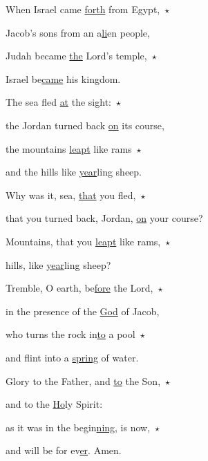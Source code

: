 \noindent When Israel came \uline{forth} from Egypt,~$\star$~\nopagebreak

Jacob’s sons from an a\uline{li}en people,

\noindent Judah became \uline{the} Lord’s temple,~$\star$~\nopagebreak

Israel be\uline{came} his kingdom.

\noindent The sea fled \uline{at} the sight:~$\star$~\nopagebreak

the Jordan turned back \uline{on} its course,

\noindent the mountains \uline{leapt} like rams~$\star$~\nopagebreak

and the hills like \uline{year}ling sheep.

\noindent Why was it, sea, \uline{that} you fled,~$\star$~\nopagebreak

that you turned back, Jordan, \uline{on} your course?

\noindent Mountains, that you \uline{leapt} like rams,~$\star$~\nopagebreak

hills, like \uline{year}ling sheep?

\noindent Tremble, O earth, be\uline{fore} the Lord,~$\star$~\nopagebreak

in the presence of the \uline{God} of Jacob,

\noindent who turns the rock in\uline{to} a pool~$\star$~\nopagebreak

and flint into a \uline{spring} of water.

\noindent Glory to the Father, and \uline{to} the Son,~$\star$~\nopagebreak

and to the \uline{Ho}ly Spirit:

\noindent as it was in the begin\uline{ning}, is now,~$\star$~\nopagebreak

and will be for ev\uline{er}. Amen.